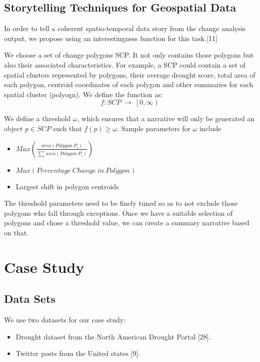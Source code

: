 \documentclass[conference]{IEEEtran}
\begin{document}
\subsection{Storytelling Techniques for Geospatial Data}

In order to tell a coherent spatio-temporal data story from the change analysis output, we propose using an interestingness function for this task.[11]

We choose a set of change polygons SCP. It not only contains those polygons but also their associated characteristics. For example, a SCP could contain a set of spatial clusters represented by polygons, their average drought score, total area of each polygon, centroid coordinates of each polygon and other summaries for each spatial cluster (polyogn). We define the function as:
\[f:SCP\ \rightarrow\ \left[0\right.,\left.\infty\right)\]

We define a threshold $\omega$, which ensures that a narrative will only be generated an object $p \in SCP$ such that $f(p) \ge \omega$. Sample parameters for $\omega$ include  

\begin{itemize}
\item $Max\left(\frac{area\left(Polygon\ P_i\right)}{\sum_{1}^{i}area\left(Polygon\ P_i\right)}\right)$
\item $Max\left(Percentage\ Change\ in\ Polygon\right)$
\item Largest shift in polygon centroids
\end{itemize}

The threshold parameters need to be finely tuned so as to not exclude those polygons who fall through exceptions. Once we have a suitable selection of polygons and chose a threshold value, we can create a summary narrative based on that. 


\section{Case Study}

\subsection{Data Sets}

We use two datasets for our case study:
\begin{itemize}
\item Drought dataset from the North American Drought Portal [28].
\item Twitter posts from the United states [9].
\end{itemize}
\end{document}
